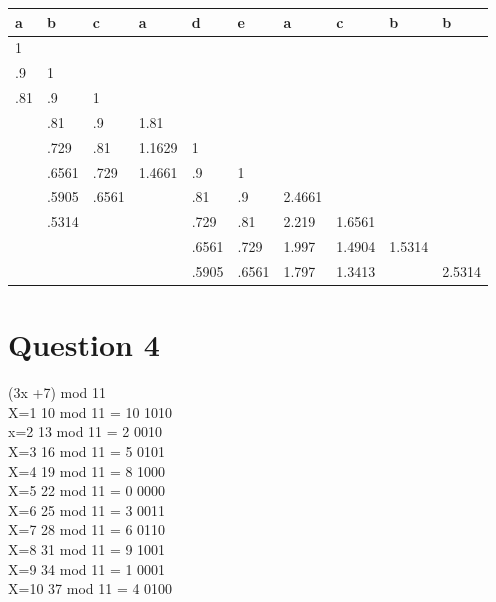 \documentclass{article}
\begin{document}
\begin{center}
\begin{table}[h]
\begin{tabular}{|l|l|l|l|l|l|l|l|l|l|}
\hline
\textbf{a} & \textbf{b} & \textbf{c} & \textbf{a} & \textbf{d} & \textbf{e} & \textbf{a} & \textbf{c} & \textbf{b} & \textbf{b} \\ \hline
1          &            &            &            &            &            &            &            &            &            \\ \hline
.9         & 1          &            &            &            &            &            &            &            &            \\ \hline
.81        & .9         & 1          &            &            &            &            &            &            &            \\ \hline
           & .81        & .9         & 1.81       &            &            &            &            &            &            \\ \hline
           & .729       & .81        & 1.1629     & 1          &            &            &            &            &            \\ \hline
           & .6561      & .729       & 1.4661     & .9         & 1          &            &            &            &            \\ \hline
           & .5905      & .6561      &            & .81        & .9         & 2.4661     &            &            &            \\ \hline
           & .5314      &            &            & .729       & .81        & 2.219      & 1.6561     &            &            \\ \hline
           &            &            &            & .6561      & .729       & 1.997      & 1.4904     & 1.5314     &            \\ \hline
           &            &            &            & .5905      & .6561      & 1.797      & 1.3413     &            & 2.5314     \\ \hline
\end{tabular}
\end{table}
\end{center}

\section{Question 4}

(3x +7) mod 11\\
X=1 10 mod 11 = 10 1010\\
x=2 13 mod 11 = 2 0010\\
X=3 16 mod 11 = 5 0101\\
X=4 19 mod 11 = 8 1000\\
X=5 22 mod 11 = 0 0000\\
X=6 25 mod 11 = 3 0011\\
X=7 28 mod 11 = 6 0110\\
X=8 31 mod 11 = 9 1001\\
X=9 34 mod 11 = 1 0001\\
X=10 37 mod 11 = 4 0100\\
\end{document}
